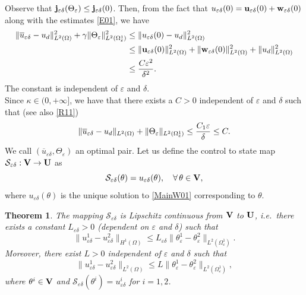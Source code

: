 \documentclass[11pt,a4paper]{article}
\numberwithin{equation}{section}
\def\wo{\overline}
\def\O{\Omega}
\def\d{\delta}
\def\e{\varepsilon}
\def\Sc{{\mathcal{S}}}
\def\ed{{\varepsilon\delta}}
\def\Gj{{\bf j}}
\def\Gu{{\bf u}}
\def\Gw{{\bf w}}
\def\GU{{\bf U}}
\def\GV{{\bf V}}
\newtheorem{theorem}{Theorem}[section]
\begin{document}
Observe that $\Gj_{\ed}(\Theta_\e)\leq \Gj_{\ed}(0)$. Then, from the fact that $u_\ed(0)=\Gu_\ed(0)+\Gw_\ed(0)$ along with the estimates \eqref{E01}, we have
\begin{equation}\label{UBOC}
	\begin{aligned}
		\|\wo u_\ed-u_d\|^2_{L^2(\O)}+\gamma\|\Theta_\e\|^2_{L^2(\O^1_\e)}
		&\leq \|u_\ed(0)-u_d\|^2_{L^2(\O)}\\
		&\leq \|\Gu_\ed(0)\|^2_{L^2(\O)}+\|\Gw_\ed(0)\|^2_{L^2(\O)}+\|u_d\|^2_{L^2(\O)}\\
		&\leq {C\e^2\over \d^2}.
	\end{aligned}
\end{equation}
The constant is independent of $\e$ and $\d$.\\
Since $\kappa\in(0,+\infty]$, we have that there exists a $C>0$ independent of $\e$ and $\d$ such that (see also \eqref{R11})
\begin{equation}\label{UBOCC}
		\|\wo u_\ed-u_d\|_{L^2(\O)}+	\|\Theta_\e\|_{L^2(\O^1_\e)}\leq {C_1\e\over \d}\leq C.
\end{equation}		
We call $(\wo u_\ed,\Theta_\e)$ an optimal pair. 			Let us define the control to state map $\Sc_\ed:\GV\to\GU$ as
$$\Sc_\ed(\theta)=u_\ed(\theta),\quad \forall\,\theta\in \GV,$$
where $u_\ed(\theta)$ is the unique solution to \eqref{MainW01} corresponding to $\theta$.
\begin{theorem}\label{Th03}
	The mapping $\Sc_\ed$ is Lipschitz continuous from $\GV$ to $\GU$, i.e.~there exists a constant $L_\ed>0$ (dependent on $\e$ and $\d$) such that
	\begin{equation}\label{CS01}
		\|u^1_{\ed}-u^2_\ed\|_{H^1(\O)}\leq L_\ed\|\theta_\e^1-\theta_\e^2\|_{L^2(\O^1_\e)}.
	\end{equation}
	Moreover, there exist $L>0$ independent of $\e$ and $\d$ such that
	\begin{equation}\label{CS02}
		\|u^1_{\ed}-u^2_\ed\|_{L^2(\O)}\leq L\|\theta_\e^1-\theta_\e^2\|_{L^2(\O^1_\e)},
	\end{equation}
	where $\theta^i\in \GV$ and $\Sc_\ed(\theta^i)=u^i_\ed$ for $i=1,2$.
\end{theorem}
\end{document}

